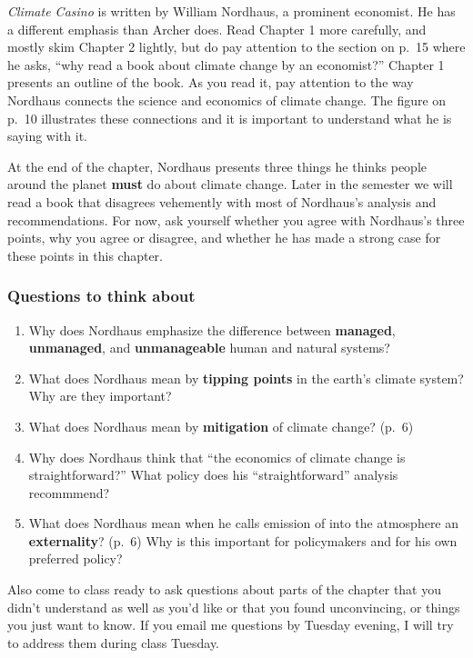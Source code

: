 \documentclass[
]{article}
\providecommand{\tightlist}{%
  \setlength{\itemsep}{0pt}\setlength{\parskip}{0pt}}
\newcommand{\COO}{\ce{CO2}}
\begin{document}
\emph{Climate Casino} is written by William Nordhaus, a prominent
economist. He has a different emphasis than Archer does. Read Chapter 1
more carefully, and mostly skim Chapter 2 lightly, but do pay attention
to the section on p.~15 where he asks, ``why read a book about climate
change by an economist?'' Chapter 1 presents an outline of the book. As
you read it, pay attention to the way Nordhaus connects the science and
economics of climate change. The figure on p.~10 illustrates these
connections and it is important to understand what he is saying with it.

At the end of the chapter, Nordhaus presents three things he thinks
people around the planet \textbf{must} do about climate change. Later in
the semester we will read a book that disagrees vehemently with most of
Nordhaus's analysis and recommendations. For now, ask yourself whether
you agree with Nordhaus's three points, why you agree or disagree, and
whether he has made a strong case for these points in this chapter.

\hypertarget{questions-to-think-about-1}{%
\subsubsection{Questions to think
about}\label{questions-to-think-about-1}}

\begin{enumerate}
\def\labelenumi{\arabic{enumi}.}
\tightlist
\item
  Why does Nordhaus emphasize the difference between \textbf{managed},
  \textbf{unmanaged}, and \textbf{unmanageable} human and natural
  systems?
\item
  What does Nordhaus mean by \textbf{tipping points} in the earth's
  climate system? Why are they important?
\item
  What does Nordhaus mean by \textbf{mitigation} of climate change?
  (p.~6)
\item
  Why does Nordhaus think that ``the economics of climate change is
  straightforward?'' What policy does his ``straightforward'' analysis
  recommmend?
\item
  What does Nordhaus mean when he calls emission of \COO into the
  atmosphere an \textbf{externality}? (p.~6) Why is this important for
  policymakers and for his own preferred policy?
\end{enumerate}

Also come to class ready to ask questions about parts of the chapter
that you didn't understand as well as you'd like or that you found
unconvincing, or things you just want to know. If you email me questions
by Tuesday evening, I will try to address them during class Tuesday.
\end{document}
